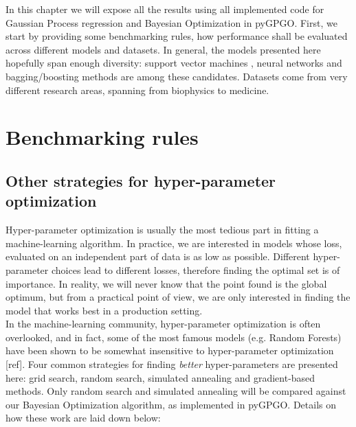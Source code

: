 \documentclass[10pt,a4paper,twoside]{book}
\begin{document}
In this chapter we will expose all the results using all implemented code for Gaussian Process regression and Bayesian Optimization in pyGPGO. First, we start by providing some benchmarking rules, how performance shall be evaluated across different models and datasets. In general, the models presented here hopefully span enough diversity: support vector machines , neural networks and bagging/boosting methods are among these candidates. Datasets come from very different research areas, spanning from biophysics to medicine. 


\section{Benchmarking rules}
\subsection{Other strategies for hyper-parameter optimization}

Hyper-parameter optimization is usually the most tedious part in fitting a machine-learning algorithm. In practice, we are interested in models whose loss, evaluated on an independent part of data is as low as possible. Different hyper-parameter choices lead to different losses, therefore finding the optimal set is of importance. In reality, we will never know that the point found is the global optimum, but from a practical point of view, we are only interested in finding the model that works best in a production setting.\\

In the machine-learning community, hyper-parameter optimization is often overlooked, and in fact, some of the most famous models (e.g. Random Forests) have been shown to be somewhat insensitive to hyper-parameter optimization [ref]. Four common strategies for finding \textit{better} hyper-parameters are presented here: grid search, random search, simulated annealing and gradient-based methods. Only random search and simulated annealing will be compared against our Bayesian Optimization algorithm, as implemented in pyGPGO. Details on how these work are laid down below:
\end{document}
